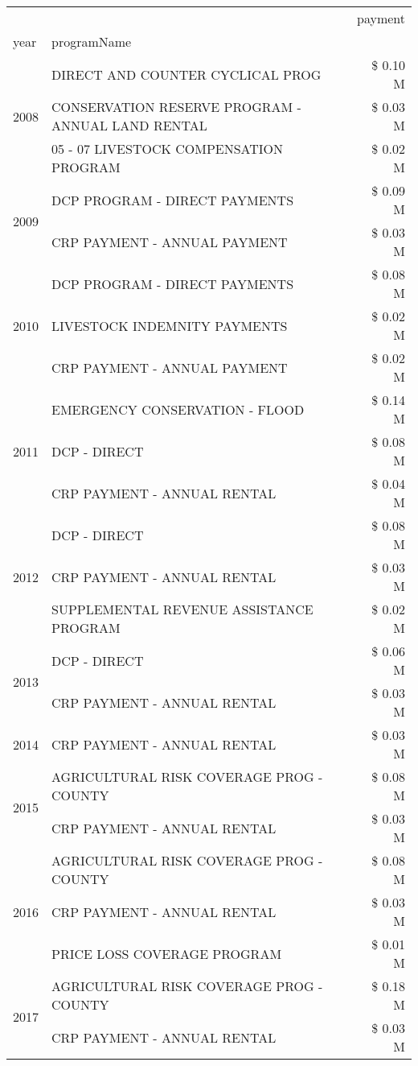 \begin{tabular}{llr}
\toprule
 &  & payment \\
year & programName &  \\
\midrule
\multirow[t]{3}{*}{2008} & DIRECT AND COUNTER CYCLICAL PROG & \$ 0.10 M \\
 & CONSERVATION RESERVE PROGRAM - ANNUAL LAND RENTAL & \$ 0.03 M \\
 & 05 - 07 LIVESTOCK COMPENSATION PROGRAM & \$ 0.02 M \\
\cline{1-3}
\multirow[t]{2}{*}{2009} & DCP PROGRAM - DIRECT PAYMENTS & \$ 0.09 M \\
 & CRP PAYMENT - ANNUAL PAYMENT & \$ 0.03 M \\
\cline{1-3}
\multirow[t]{3}{*}{2010} & DCP PROGRAM - DIRECT PAYMENTS & \$ 0.08 M \\
 & LIVESTOCK INDEMNITY PAYMENTS & \$ 0.02 M \\
 & CRP PAYMENT - ANNUAL PAYMENT & \$ 0.02 M \\
\cline{1-3}
\multirow[t]{3}{*}{2011} & EMERGENCY CONSERVATION - FLOOD & \$ 0.14 M \\
 & DCP - DIRECT & \$ 0.08 M \\
 & CRP PAYMENT - ANNUAL RENTAL & \$ 0.04 M \\
\cline{1-3}
\multirow[t]{3}{*}{2012} & DCP - DIRECT & \$ 0.08 M \\
 & CRP PAYMENT - ANNUAL RENTAL & \$ 0.03 M \\
 & SUPPLEMENTAL REVENUE ASSISTANCE PROGRAM & \$ 0.02 M \\
\cline{1-3}
\multirow[t]{2}{*}{2013} & DCP - DIRECT & \$ 0.06 M \\
 & CRP PAYMENT - ANNUAL RENTAL & \$ 0.03 M \\
\cline{1-3}
2014 & CRP PAYMENT - ANNUAL RENTAL & \$ 0.03 M \\
\cline{1-3}
\multirow[t]{2}{*}{2015} & AGRICULTURAL RISK COVERAGE PROG - COUNTY & \$ 0.08 M \\
 & CRP PAYMENT - ANNUAL RENTAL & \$ 0.03 M \\
\cline{1-3}
\multirow[t]{3}{*}{2016} & AGRICULTURAL RISK COVERAGE PROG - COUNTY & \$ 0.08 M \\
 & CRP PAYMENT - ANNUAL RENTAL & \$ 0.03 M \\
 & PRICE LOSS COVERAGE PROGRAM & \$ 0.01 M \\
\cline{1-3}
\multirow[t]{3}{*}{2017} & AGRICULTURAL RISK COVERAGE PROG - COUNTY & \$ 0.18 M \\
 & CRP PAYMENT - ANNUAL RENTAL & \$ 0.03 M \\

\end{tabular}
